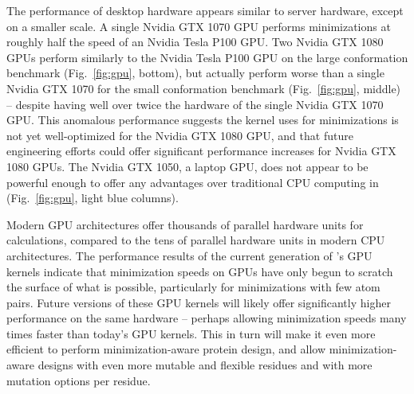 The performance of desktop hardware appears similar to server hardware, except on a smaller scale. A single Nvidia GTX 1070 GPU performs minimizations at roughly half the speed of an Nvidia Tesla P100 GPU. Two Nvidia GTX 1080 GPUs perform similarly to the Nvidia Tesla P100 GPU on the large conformation benchmark (Fig.~\ref{fig:gpu}, bottom), but actually perform worse than a single Nvidia GTX 1070 for the small conformation benchmark (Fig.~\ref{fig:gpu}, middle) -- despite having well over twice the hardware of the single Nvidia GTX 1070 GPU. This anomalous performance suggests the kernel  uses for minimizations is not yet well-optimized for the Nvidia GTX 1080 GPU, and that future engineering efforts could offer significant performance increases for Nvidia GTX 1080 GPUs. The Nvidia GTX 1050, a laptop GPU, does not appear to be powerful enough to offer any advantages over traditional CPU computing in  (Fig.~\ref{fig:gpu}, light blue columns).

Modern GPU architectures offer thousands of parallel hardware units for calculations, compared to the tens of parallel hardware units in modern CPU architectures. The performance results of the current generation of \osprey's GPU kernels indicate that minimization speeds on GPUs have only begun to scratch the surface of what is possible, particularly for minimizations with few atom pairs. Future versions of these GPU kernels will likely offer significantly higher performance on the same hardware -- perhaps allowing minimization speeds many times faster than today's GPU kernels.  This in turn will make it even more efficient to perform minimization-aware protein design, and allow minimization-aware designs with even more mutable and flexible residues and with more mutation options per residue.  

